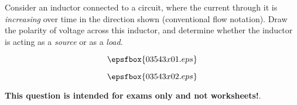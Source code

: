 

Consider an inductor connected to a circuit, where the current through it is {\it increasing} over time in the direction shown (conventional flow notation).  Draw the polarity of voltage across this inductor, and determine whether the inductor is acting as a {\it source} or as a {\it load}.

$$\epsfbox{03543x01.eps}$$







$$\epsfbox{03543x02.eps}$$







{\bf This question is intended for exams only and not worksheets!}.



